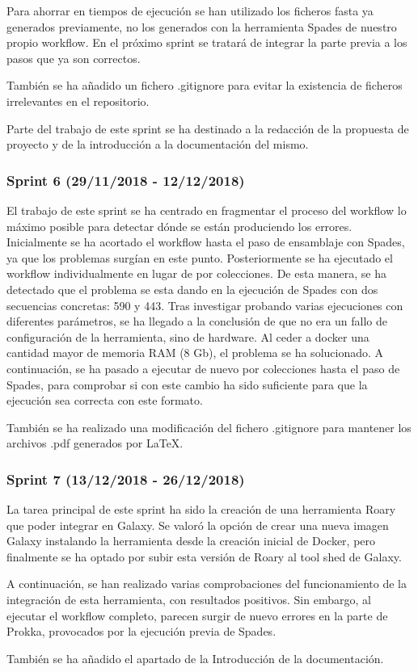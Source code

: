 Para ahorrar en tiempos de ejecución se han utilizado los ficheros fasta ya generados previamente, no los generados con la herramienta Spades de nuestro propio workflow. En el próximo sprint se tratará de integrar la parte previa a los pasos que ya son correctos.

También se ha añadido un fichero .gitignore para evitar la existencia de ficheros irrelevantes en el repositorio.

Parte del trabajo de este sprint se ha destinado a la redacción de la propuesta de proyecto y de la introducción a la documentación del mismo.

\subsubsection{Sprint 6 (29/11/2018 - 12/12/2018)}
El trabajo de este sprint se ha centrado en fragmentar el proceso del workflow lo máximo posible para detectar dónde se están produciendo los errores.
Inicialmente se ha acortado el workflow hasta el paso de ensamblaje con Spades, ya que los problemas surgían en este punto. Posteriormente se ha ejecutado el workflow individualmente en lugar de por colecciones. De esta manera, se ha detectado que el problema se esta dando en la ejecución de Spades con dos secuencias concretas: 590 y 443. Tras investigar probando varias ejecuciones con diferentes parámetros, se ha llegado a la conclusión de que no era un fallo de configuración de la herramienta, sino de hardware. Al ceder a docker una cantidad mayor de memoria RAM (8 Gb), el problema se ha solucionado. 
A continuación, se ha pasado a ejecutar de nuevo por colecciones hasta el paso de Spades, para comprobar si con este cambio ha sido suficiente para que la ejecución sea correcta con este formato. 

También se ha realizado una modificación del fichero .gitignore para mantener los archivos .pdf generados por LaTeX.

\subsubsection{Sprint 7 (13/12/2018 - 26/12/2018)}
La tarea principal de este sprint ha sido la creación de una herramienta Roary que poder integrar en Galaxy. Se valoró la opción de crear una nueva imagen Galaxy instalando la herramienta desde la creación inicial de Docker, pero finalmente se ha optado por subir esta versión de Roary al tool shed de Galaxy.

A continuación, se han realizado varias comprobaciones del funcionamiento de la integración de esta herramienta, con resultados positivos. Sin embargo, al ejecutar el workflow completo, parecen surgir de nuevo errores en la parte de Prokka, provocados por la ejecución previa de Spades. 

También se ha añadido el apartado de la Introducción de la documentación.

\newpage \thispagestyle{empty} %